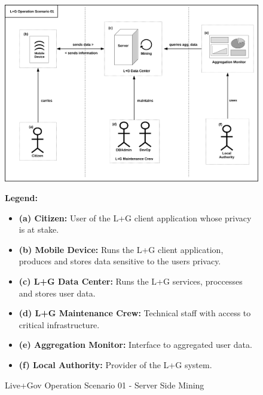 \begin{figure}[h]
\centering
\includegraphics{diagrams/png/scenario01-ServerSideMining.png}

\begin{flushleft}
\scriptsize
\textbf{Legend:}
\begin{itemize}
\itemsep1pt\parskip0pt
\item
  \textbf{(a) Citizen:} User of the L+G client application whose privacy
  is at stake.
\item
  \textbf{(b) Mobile Device:} Runs the L+G client application, produces
  and stores data sensitive to the users privacy.
\item
  \textbf{(c) L+G Data Center:} Runs the L+G services, proccesses and
  stores user data.
\item
  \textbf{(d) L+G Maintenance Crew:} Technical staff with access to
  critical infrastructure.
\item
  \textbf{(e) Aggregation Monitor:} Interface to aggregated user data.
\item
  \textbf{(f) Local Authority:} Provider of the L+G system.
\end{itemize}
\end{flushleft}

\caption{Live+Gov Operation Scenario 01 - Server Side Mining}
\label{figure:Live+Gov Operation Scenario 01 - Server Side Mining}
\end{figure}
